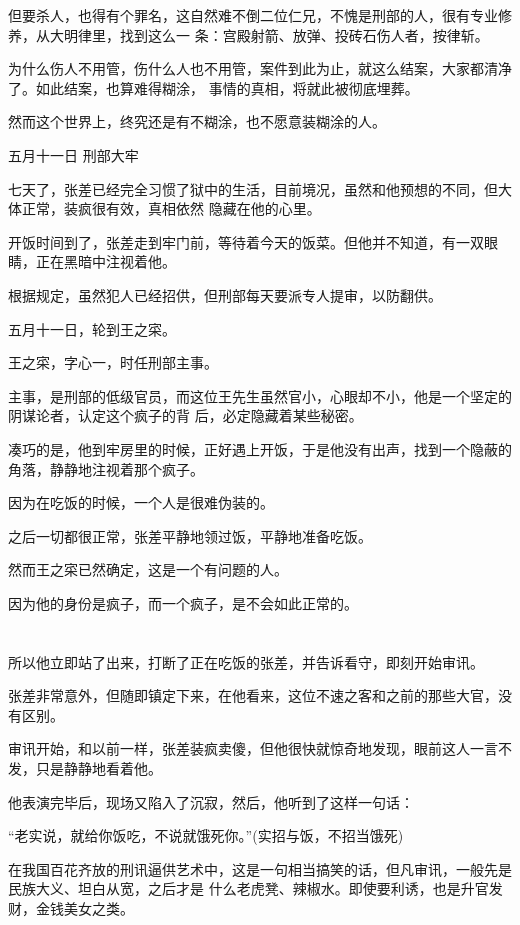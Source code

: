 \documentclass[11pt,a4paper,onecolumn]{article}
\begin{document}
但要杀人，也得有个罪名，这自然难不倒二位仁兄，不愧是刑部的人，很有专业修养，从大明律里，找到这么一
条：宫殿射箭、放弹、投砖石伤人者，按律斩。

为什么伤人不用管，伤什么人也不用管，案件到此为止，就这么结案，大家都清净了。如此结案，也算难得糊涂，
事情的真相，将就此被彻底埋葬。

然而这个世界上，终究还是有不糊涂，也不愿意装糊涂的人。

五月十一日 刑部大牢

七天了，张差已经完全习惯了狱中的生活，目前境况，虽然和他预想的不同，但大体正常，装疯很有效，真相依然
隐藏在他的心里。

开饭时间到了，张差走到牢门前，等待着今天的饭菜。但他并不知道，有一双眼睛，正在黑暗中注视着他。

根据规定，虽然犯人已经招供，但刑部每天要派专人提审，以防翻供。

五月十一日，轮到王之寀。

王之寀，字心一，时任刑部主事。

主事，是刑部的低级官员，而这位王先生虽然官小，心眼却不小，他是一个坚定的阴谋论者，认定这个疯子的背
后，必定隐藏着某些秘密。

凑巧的是，他到牢房里的时候，正好遇上开饭，于是他没有出声，找到一个隐蔽的角落，静静地注视着那个疯子。

因为在吃饭的时候，一个人是很难伪装的。

之后一切都很正常，张差平静地领过饭，平静地准备吃饭。

然而王之寀已然确定，这是一个有问题的人。

因为他的身份是疯子，而一个疯子，是不会如此正常的。

\section[\thesection]{}

所以他立即站了出来，打断了正在吃饭的张差，并告诉看守，即刻开始审讯。

张差非常意外，但随即镇定下来，在他看来，这位不速之客和之前的那些大官，没有区别。

审讯开始，和以前一样，张差装疯卖傻，但他很快就惊奇地发现，眼前这人一言不发，只是静静地看着他。

他表演完毕后，现场又陷入了沉寂，然后，他听到了这样一句话：

``老实说，就给你饭吃，不说就饿死你。''(实招与饭，不招当饿死)

在我国百花齐放的刑讯逼供艺术中，这是一句相当搞笑的话，但凡审讯，一般先是民族大义、坦白从宽，之后才是
什么老虎凳、辣椒水。即使要利诱，也是升官发财，金钱美女之类。
\end{document}
